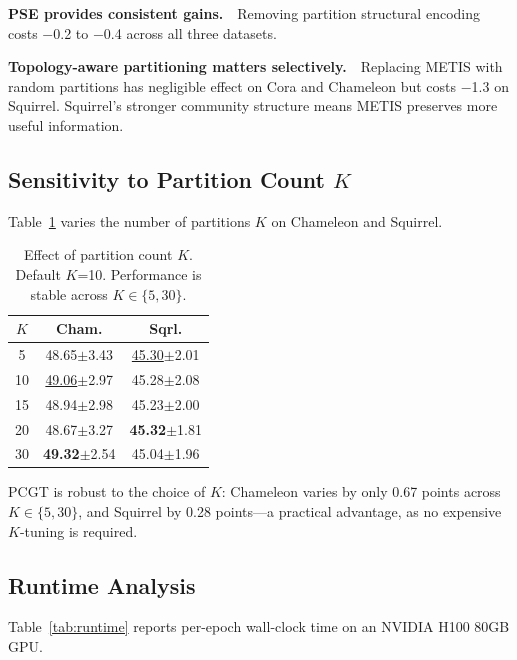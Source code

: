 \documentclass[manuscript, screen, review, anonymous]{acmart}
\newcommand{\best}[1]{\textcolor{bestcolor}{\textbf{#1}}}
\newcommand{\runup}[1]{\textcolor{runnerup}{\underline{#1}}}
\begin{document}
\textbf{PSE provides consistent gains.}~~Removing partition structural encoding costs $-$0.2 to $-$0.4 across all three datasets.

\textbf{Topology-aware partitioning matters selectively.}~~Replacing METIS with random partitions has negligible effect on Cora and Chameleon but costs $-$1.3 on Squirrel. Squirrel's stronger community structure means METIS preserves more useful information.

\subsection{Sensitivity to Partition Count $K$}

Table~\ref{tab:ksweep} varies the number of partitions $K$ on Chameleon and Squirrel.

\begin{table}[t]
\caption{Effect of partition count $K$. Default $K$=10. Performance is stable across $K \in \{5, 30\}$.}
\label{tab:ksweep}
\centering
\small
\begin{tabular}{c|cc}
\toprule
$K$ & \textbf{Cham.} & \textbf{Sqrl.} \\
\midrule
5  & 48.65{\scriptsize$\pm$3.43} & \runup{45.30}{\scriptsize$\pm$2.01} \\
10 & \runup{49.06}{\scriptsize$\pm$2.97} & 45.28{\scriptsize$\pm$2.08} \\
15 & 48.94{\scriptsize$\pm$2.98} & 45.23{\scriptsize$\pm$2.00} \\
20 & 48.67{\scriptsize$\pm$3.27} & \best{45.32}{\scriptsize$\pm$1.81} \\
30 & \best{49.32}{\scriptsize$\pm$2.54} & 45.04{\scriptsize$\pm$1.96} \\
\bottomrule
\end{tabular}
\end{table}

PCGT is robust to the choice of $K$: Chameleon varies by only 0.67 points across $K \in \{5, 30\}$, and Squirrel by 0.28 points---a practical advantage, as no expensive $K$-tuning is required.

\subsection{Runtime Analysis}

Table~\ref{tab:runtime} reports per-epoch wall-clock time on an NVIDIA H100 80GB GPU.
\end{document}
